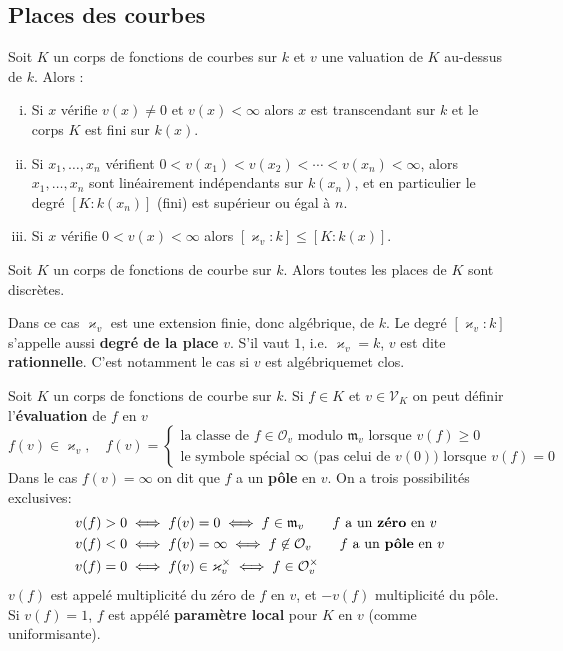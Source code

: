 \subsection{Places des courbes}

	\begin{lem}
		Soit $K$ un corps de fonctions de courbes sur $k$ et $v$ une valuation de $K$ au-dessus de $k$.
		Alors :
		\begin{enumerate}[(i)]
			\item Si $x$ vérifie $v(x) \neq 0$ et $v(x) < \infty$ alors $x$ est transcendant sur $k$ et le corps $K$ est fini sur $k(x)$.
			\item Si $x_1,\ldots,x_n$ vérifient $0 < v(x_1) < v(x_2) < \cdots < v(x_n) < \infty$, alors $x_1,\ldots,x_n$ sont linéairement indépendants sur $k(x_n)$, et en particulier le degré $[K : k(x_n)]$ (fini) est supérieur ou égal à $n$.
			\item Si $x$ vérifie $0 < v(x) < \infty$ alors $[\varkappa_v : k] \leq [K : k(x)]$.
		\end{enumerate}
	\end{lem}

	\begin{pop}
		Soit $K$ un corps de fonctions de courbe sur $k$.
		Alors toutes les places de $K$ sont discrètes.
	\end{pop}

	Dans ce cas $\varkappa_v$ est une extension finie, donc algébrique, de $k$.
	Le degré $[\varkappa_v : k]$ s'appelle aussi \textbf{degré de la place} $v$.
	S'il vaut $1$, i.e. $\varkappa_v = k$, $v$ est dite \textbf{rationnelle}.
	C'est notamment le cas si $v$ est algébriquemet clos.
	
	\begin{defn}
		Soit $K$ un corps de fonctions de courbe sur $k$.
		Si $f \in K$ et $v \in \mathscr{V}_K$ on peut définir l'\textbf{évaluation} de $f$ en $v$
		$$f(v) \in \varkappa_v, \quad f(v) = \left\{ \begin{array}{l}
			\text{la classe de $f \in \mathcal{O}_v$ modulo $\mathfrak{m}_v$ lorsque $v(f) \geq 0$} \\
			\text{le symbole spécial $\infty$ (pas celui de $v(0)$) lorsque $v(f) = 0$}
			\end{array} \right.$$
		Dans le cas $f(v) = \infty$ on dit que $f$ a un \textbf{pôle} en $v$.
		On a trois possibilités exclusives:
		\begin{align*}
			v(f) > 0 & \iff f(v) = 0 \iff f \in \mathfrak{m}_v \qquad \text{$f$ a un \textbf{zéro} en $v$} \\
			v(f) < 0 & \iff f(v) = \infty \iff f \not\in \mathcal{O}_v \qquad \text{$f$ a un \textbf{pôle} en $v$} \\
			v(f) = 0 & \iff f(v) \in \varkappa_v^\times \iff f \in \mathcal{O}_v^\times
		\end{align*}
		$v(f)$ est appelé multiplicité du zéro de $f$ en $v$, et $-v(f)$ multiplicité du pôle.
		Si $v(f) = 1$, $f$ est appélé \textbf{paramètre local} pour $K$ en $v$ (comme uniformisante).
	\end{defn}


